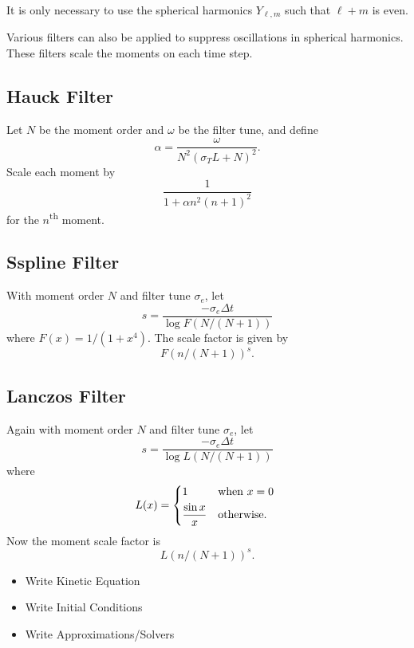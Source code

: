 \documentclass{article}
\begin{document}
It is only necessary to use the spherical harmonics $Y_{\ell,m}$ such that
$\ell + m$ is even.

Various filters can also be applied to suppress oscillations in spherical harmonics.
These filters scale the moments on each time step. 
\subsection{Hauck Filter}
Let $N$ be the moment order and $\omega$ be the filter tune, and define
\begin{equation}
    \alpha = \frac{\omega}{N^2 (\sigma_T L + N)^2}.
\end{equation}
Scale each moment by
\begin{equation}
    \frac{1}{1 + \alpha n^2 (n+1)^2}
\end{equation}
for the $n$\textsuperscript{th} moment.

\subsection{Sspline Filter}
With moment order $N$ and filter tune $\sigma_e$, let
\begin{equation}
    s = \frac{-\sigma_e \Delta t}{\log F(N/(N+1))}
\end{equation}
where $F(x) = 1/(1 + x^4)$. The scale factor is given by
\begin{equation}
    F(n/(N+1))^s.
\end{equation}

\subsection{Lanczos Filter}
Again with moment order $N$ and filter tune $\sigma_e$, let
\begin{equation}
    s = \frac{-\sigma_e \Delta t}{\log L(N / (N+1))}
\end{equation}
where
\begin{equation}
    L(x) = \begin{dcases*}
        1 & when $x=0$ \\
        \frac{\sin x}{x} & otherwise.
    \end{dcases*}
\end{equation}
Now the moment scale factor is
\begin{equation}
    L(n / (N+1))^s.
\end{equation}

\begin{itemize}
\item Write Kinetic Equation
\item Write Initial Conditions
\item Write Approximations/Solvers
\end{itemize}
\end{document}
